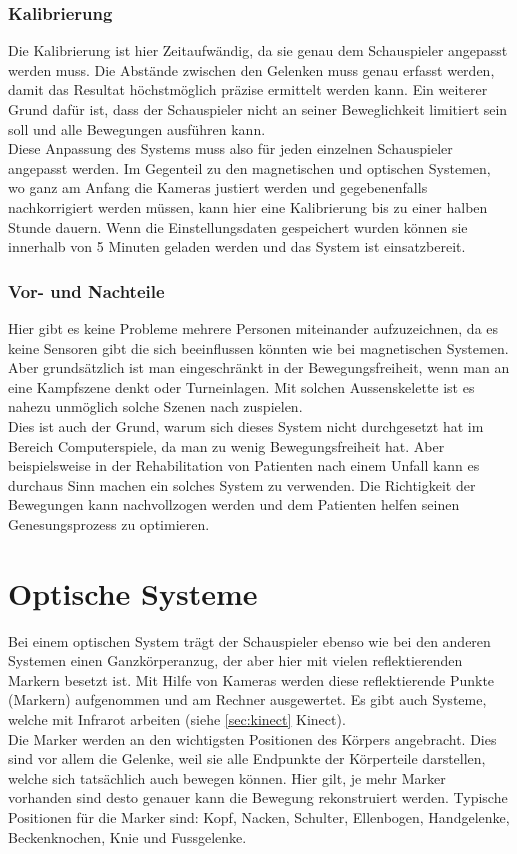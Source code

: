 \subsubsection{Kalibrierung}
Die Kalibrierung ist hier Zeitaufwändig, da sie genau dem Schauspieler angepasst werden muss. Die Abstände zwischen den Gelenken muss genau erfasst werden, damit das Resultat höchstmöglich präzise ermittelt werden kann. Ein weiterer Grund dafür ist, dass der Schauspieler nicht an seiner Beweglichkeit limitiert sein soll und alle Bewegungen ausführen kann. \\
Diese Anpassung des Systems muss also für jeden einzelnen Schauspieler angepasst werden. Im Gegenteil zu den magnetischen und optischen Systemen, wo ganz am Anfang die Kameras justiert werden und gegebenenfalls nachkorrigiert werden müssen, kann hier eine Kalibrierung bis zu einer halben Stunde dauern. Wenn die Einstellungsdaten gespeichert wurden können sie innerhalb von 5 Minuten geladen werden und das System ist einsatzbereit.

\subsubsection{Vor- und Nachteile}
 Hier gibt es keine Probleme mehrere Personen miteinander aufzuzeichnen, da es keine Sensoren gibt die sich beeinflussen könnten wie bei magnetischen Systemen. Aber grundsätzlich ist man eingeschränkt in der Bewegungsfreiheit, wenn man an eine Kampfszene denkt oder Turneinlagen. Mit solchen Aussenskelette ist es nahezu unmöglich solche Szenen nach zuspielen. \\
 Dies ist auch der Grund, warum sich dieses System nicht durchgesetzt hat im Bereich Computerspiele, da man zu wenig Bewegungsfreiheit hat. Aber beispielsweise in der Rehabilitation von Patienten nach einem Unfall kann es durchaus Sinn machen ein solches System zu verwenden. Die Richtigkeit der Bewegungen kann nachvollzogen werden und dem Patienten helfen seinen Genesungsprozess zu optimieren.

\section{Optische Systeme}
\label{sec:optische_systeme}

Bei einem optischen System trägt der Schauspieler ebenso wie bei den anderen Systemen einen Ganzkörperanzug, der aber hier mit vielen reflektierenden Markern besetzt ist. Mit Hilfe von Kameras werden diese reflektierende Punkte (Markern) aufgenommen und am Rechner ausgewertet. Es gibt auch Systeme, welche mit Infrarot arbeiten (siehe \ref{sec:kinect} Kinect). \\
Die Marker werden an den wichtigsten Positionen des Körpers angebracht. Dies sind vor allem die Gelenke, weil sie alle Endpunkte der Körperteile darstellen, welche sich tatsächlich auch bewegen können. Hier gilt, je mehr Marker vorhanden sind desto genauer kann die Bewegung rekonstruiert werden. Typische Positionen für die Marker sind: Kopf, Nacken, Schulter, Ellenbogen, Handgelenke, Beckenknochen, Knie und Fussgelenke.

